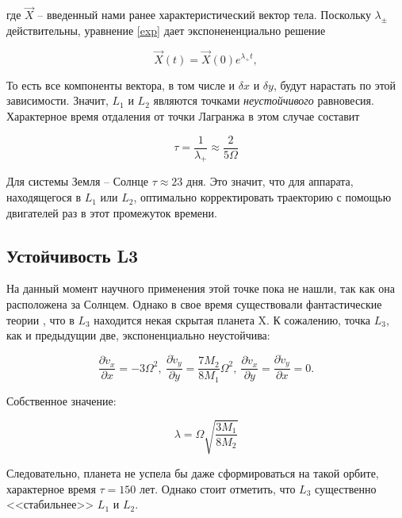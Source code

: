 \documentclass[12pt]{article}
\begin{document}
    где $\vec{X}$ -- введенный нами ранее характеристический вектор тела. Поскольку 
    $\lambda_{\pm}$ действительны, уравнение \ref{exp} дает экспонененциально решение

    \begin{equation}
        \vec{X}(t) = \vec{X}(0)e^{\lambda_{+}t},
    \end{equation}

    То есть все компоненты вектора, в том числе и $\delta x$ и $\delta y$, будут нарастать
    по этой зависимости. Значит, $L_1$ и $L_2$ являются точками \textit{неустойчивого}
    равновесия.
    Характерное время отдаления от точки Лагранжа в этом случае составит

    \begin{equation}
        \tau = \frac{1}{\lambda_{+}} \approx \frac{2}{5\Omega}
    \end{equation}

    Для системы Земля -- Солнце $\tau \approx 23$ дня. Это значит, что для аппарата, находящегося
    в $L_1$ или $L_2$, оптимально корректировать траекторию с помощью двигателей раз в этот
    промежуток времени.

    \subsection{Устойчивость L3}
    На данный момент научного применения этой точке пока не нашли, так как она расположена
    за Солнцем. Однако в свое время существовали фантастические теории \cite{nasabrief}, что
    в $L_3$ находится некая скрытая планета X. К сожалению, точка $L_3$, как и предыдущии
    две, экспоненциально неустойчива:

    \begin{equation}
        \frac{\partial \dot{v}_x}{\partial x} = - 3\Omega^2,\ 
        \frac{\partial \dot{v}_y}{\partial y} = \frac{7M_2}{8M_1}\Omega^2,\
        \frac{\partial \dot{v}_x}{\partial y} = \frac{\partial \dot{v}_y}{\partial x} = 0. 
    \end{equation}

    Собственное значение:
    
    \begin{equation}
        \lambda = \Omega \sqrt{\frac{3M_1}{8M_2}}
    \end{equation}

    Следовательно, планета не успела бы даже сформироваться на такой орбите, характерное
    время $\tau = 150$ лет. Однако стоит отметить, что $L_3$ существенно <<стабильнее>>
    $L_1$ и $L_2$.
\end{document}
